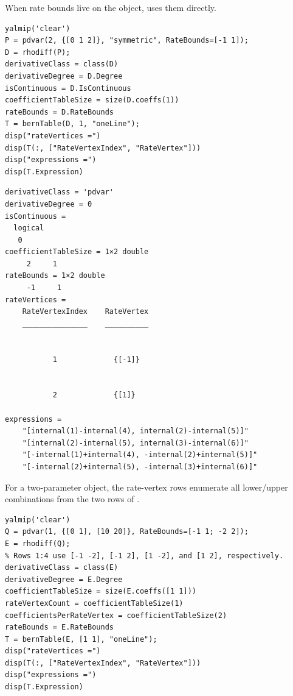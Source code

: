 \examplehead
When rate bounds live on the object,  uses them directly.

\begin{lstlisting}[style=dpmatlab]
yalmip('clear')
P = pdvar(2, {[0 1 2]}, "symmetric", RateBounds=[-1 1]);
D = rhodiff(P);
derivativeClass = class(D)
derivativeDegree = D.Degree
isContinuous = D.IsContinuous
coefficientTableSize = size(D.coeffs(1))
rateBounds = D.RateBounds
T = bernTable(D, 1, "oneLine");
disp("rateVertices =")
disp(T(:, ["RateVertexIndex", "RateVertex"]))
disp("expressions =")
disp(T.Expression)
\end{lstlisting}

\begin{lstlisting}[style=dpwideoutput]
derivativeClass = 'pdvar'
derivativeDegree = 0
isContinuous =
  logical
   0
coefficientTableSize = 1×2 double
     2     1
rateBounds = 1×2 double
     -1     1
rateVertices =
    RateVertexIndex    RateVertex
    _______________    __________


           1             {[-1]}


           2             {[1]}

expressions =
    "[internal(1)-internal(4), internal(2)-internal(5)]"
    "[internal(2)-internal(5), internal(3)-internal(6)]"
    "[-internal(1)+internal(4), -internal(2)+internal(5)]"
    "[-internal(2)+internal(5), -internal(3)+internal(6)]"
\end{lstlisting}

For a two-parameter object, the rate-vertex rows enumerate all lower/upper combinations from the two rows of .

\begin{lstlisting}[style=dpmatlab]
yalmip('clear')
Q = pdvar(1, {[0 1], [10 20]}, RateBounds=[-1 1; -2 2]);
E = rhodiff(Q);
% Rows 1:4 use [-1 -2], [-1 2], [1 -2], and [1 2], respectively.
derivativeClass = class(E)
derivativeDegree = E.Degree
coefficientTableSize = size(E.coeffs([1 1]))
rateVertexCount = coefficientTableSize(1)
coefficientsPerRateVertex = coefficientTableSize(2)
rateBounds = E.RateBounds
T = bernTable(E, [1 1], "oneLine");
disp("rateVertices =")
disp(T(:, ["RateVertexIndex", "RateVertex"]))
disp("expressions =")
disp(T.Expression)
\end{lstlisting}


